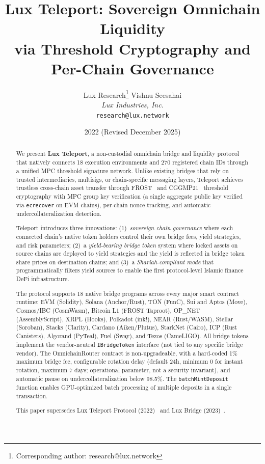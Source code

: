 \documentclass[11pt]{article}
\title{Lux Teleport: Sovereign Omnichain Liquidity\\via Threshold Cryptography and\\Per-Chain Governance}
\author{
Lux Research\thanks{Corresponding author: research@lux.network}
\quad
Vishnu Seesahai\\
\textit{Lux Industries, Inc.}\\
\texttt{research@lux.network}
}
\date{2022 (Revised December 2025)}
\begin{document}
\luxcoverpage

\begin{abstract}
We present \textbf{Lux Teleport}, a non-custodial omnichain bridge and liquidity protocol that natively connects 18 execution environments and 270 registered chain IDs through a unified MPC threshold signature network. Unlike existing bridges that rely on trusted intermediaries, multisigs, or chain-specific messaging layers, Teleport achieves trustless cross-chain asset transfer through FROST~\cite{frost} and CGGMP21~\cite{cggmp21} threshold cryptography with MPC group key verification (a single aggregate public key verified via \texttt{ecrecover} on EVM chains), per-chain nonce tracking, and automatic undercollateralization detection.

Teleport introduces three innovations: (1)~\emph{sovereign chain governance} where each connected chain's native token holders control their own bridge fees, yield strategies, and risk parameters; (2)~a \emph{yield-bearing bridge token} system where locked assets on source chains are deployed to yield strategies and the yield is reflected in bridge token share prices on destination chains; and (3)~a \emph{Shariah-compliant mode} that programmatically filters yield sources to enable the first protocol-level Islamic finance DeFi infrastructure.

The protocol supports 18 native bridge programs across every major smart contract runtime: EVM (Solidity), Solana (Anchor/Rust), TON (FunC), Sui and Aptos (Move), Cosmos/IBC (CosmWasm), Bitcoin L1 (FROST Taproot), OP\_NET (AssemblyScript), XRPL (Hooks), Polkadot (ink!), NEAR (Rust/WASM), Stellar (Soroban), Stacks (Clarity), Cardano (Aiken/Plutus), StarkNet (Cairo), ICP (Rust Canisters), Algorand (PyTeal), Fuel (Sway), and Tezos (CameLIGO). All bridge tokens implement the vendor-neutral \texttt{IBridgeToken} interface (not tied to any specific bridge vendor). The OmnichainRouter contract is non-upgradeable, with a hard-coded 1\% maximum bridge fee, configurable rotation delay (default 24h, minimum 0 for instant rotation, maximum 7 days; operational parameter, not a security invariant), and automatic pause on undercollateralization below 98.5\%. The \texttt{batchMintDeposit} function enables GPU-optimized batch processing of multiple deposits in a single transaction.

This paper supersedes Lux Teleport Protocol (2022)~\cite{luxtp2022} and Lux Bridge (2023)~\cite{luxbridge2023}.
\end{abstract}

\tableofcontents














\end{document}
